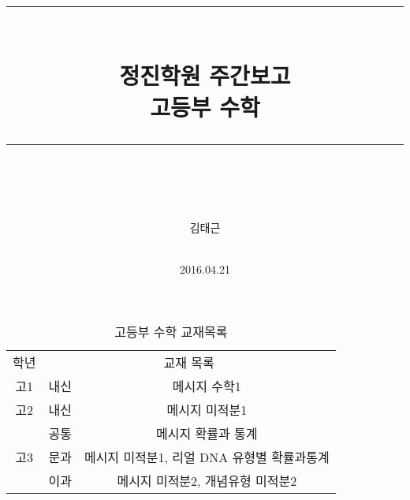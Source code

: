 \documentclass[idxtotoc,hyperref,openany]{labbook} %
\newcommand{\HRule}{\rule{\linewidth}{0.5mm}} %
\begin{document}

\frontmatter %
\title{
\begin{center}
\HRule \\[0.4cm]
{\Huge \bfseries 정진학원 주간보고  \\[0.5cm] \Large 고등부 수학}\\[0.4cm] %
\HRule \\[1.5cm]
\end{center}
}
\author{\LARGE 김태근 \\  \\[2cm]} %
\date{2016.04.21} %
\maketitle

\tableofcontents

\mainmatter %












\begin{table}[h]
\centering
\begin{adjustbox}{width=.9\textwidth}
\begin{tabular}{c||c|c}
\toprule
\midrule
학년 & \multicolumn{2}{c}{교재 목록} \\
\hhline{=||==}
고1 & 내신 & 메시지 수학1 \\
\hline
고2 & 내신 & 메시지 미적분1\\
\hline
\multirow{3}{*}{고3} & 공통 & 메시지 확률과 통계 \\ \hhline{~--}
					& 문과 & 메시지 미적분1, 리얼 DNA 유형별 확률과통계\\ \hhline{~--}
					& 이과 & 메시지 미적분2, 개념유형 미적분2\\

\hline
\end{tabular}
\end{adjustbox}
\caption{\label{tab:i} 고등부 수학 교재목록 }
\end{table}
\end{document}
